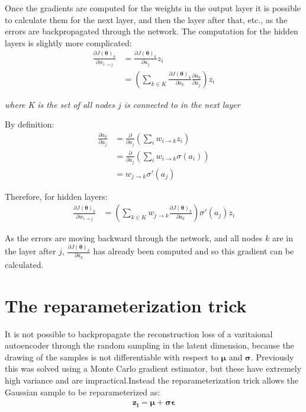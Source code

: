 \documentclass[12pt,a4paper,twoside,openright]{report}
\renewcommand{\vec}[1]{\bm{#1}}
\begin{document}
Once the gradients are computed for the weights in the output layer it is possible to calculate them for the next layer, and then the
layer after that, etc., as the errors are backpropagated through the network. The computation for the hidden layers is slightly more 
complicated:
\begin{align}
  \frac{\partial J(\vec{\theta})_k}{\partial w_{i \to j}} & = \frac{\partial J(\vec{\theta})_k}{\partial a_j} z_i \\
  & = \left( \sum_{k \in K} \frac{\partial J(\vec{\theta})_k}{\partial a_k} \frac{\partial a_k}{\partial a_j} \right) z_i
\end{align}
\begin{center}
  \textit{where K is the set of all nodes $j$ is connected to in the next layer}
\end{center}

By definition:
\begin{align}
  \frac{\partial a_k}{\partial a_j} & = \frac{\partial}{\partial a_j} \left( \sum_{i} w_{i \to k} z_i \right) \\
  & = \frac{\partial}{\partial a_j} \left( \sum_{i} w_{i \to k} \sigma(a_i) \right) \\
  & = w_{j \to k} \sigma'(a_j)
\end{align}

Therefore, for hidden layers:
\begin{align}
  \frac{\partial J(\vec{\theta})_k}{\partial w_{i \to j}} & = \left( \sum_{k \in K} w_{j \to k} \frac{\partial J(\vec{\theta})_k}{\partial a_k} \right) \sigma'(a_j) z_i
\end{align}

As the errors are moving backward through the network, and all nodes $k$ are in the layer after $j$, $\frac{\partial J(\vec{\theta})_k}{\partial a_k}$
has already been computed and so this gradient can be calculated.

\chapter{The reparameterization trick} \label{reparam}

It is not possible to backpropagate the reconstruction loss of a varitaional autoencoder through the random sampling in the latent dimension, because the drawing of
the samples is not differentiable with respect to $\vec{\mu}$ and $\vec{\sigma}$. Previously this was solved using a Monte Carlo gradient estimator, but these have 
extremely high variance and are impractical.Instead the reparameterization trick allows the Gaussian sample to be reparameterized as:
\begin{align}
  \vec{z_{i}} = \vec{\mu} + \vec{\sigma}\vec{\epsilon}
\end{align}
\end{document}
